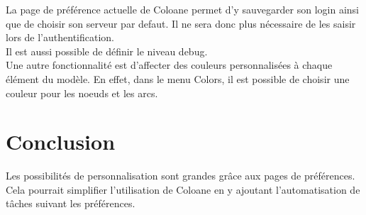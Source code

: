 \documentclass{article}
\begin{document}
La page de pr\'ef\'erence actuelle de Coloane permet d'y sauvegarder son login ainsi que de choisir son serveur par defaut. Il ne sera donc plus n\'ecessaire de les saisir lors de l'authentification.\\

Il est aussi possible de d\'efinir le niveau debug.\\

Une autre fonctionnalit\'e est d'affecter des couleurs personnalis\'ees \`a chaque \'el\'ement du mod\`ele.
En effet, dans le menu Colors, il est possible de choisir une couleur pour les noeuds et les arcs.


\section{Conclusion}

Les possibilit\'es de personnalisation sont grandes gr\^ace aux pages de pr\'ef\'erences.
Cela pourrait simplifier l'utilisation de Coloane en y ajoutant l'automatisation de t\^aches suivant les pr\'ef\'erences.
\end{document}
